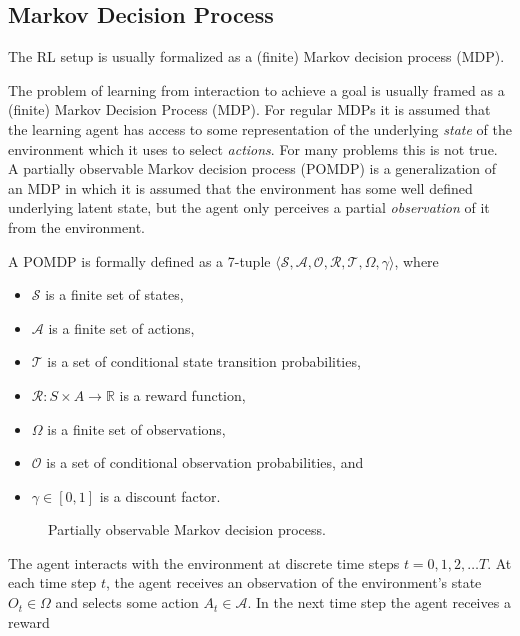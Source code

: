 \subsection{Markov Decision Process}

The RL setup is usually formalized as a (finite) Markov decision process (MDP).

The problem of learning from interaction to achieve a goal is usually framed as a (finite) Markov Decision Process (MDP). For regular MDPs it is assumed that the learning agent has access to some representation of the underlying \textit{state} of the environment which it uses to select \textit{actions}. For many problems this is not true. A partially observable Markov decision process (POMDP) is a generalization of an MDP in which it is assumed that the environment has some well defined underlying latent state, but the agent only perceives a partial \textit{observation} of it from the environment. 

A POMDP is formally defined as a 7-tuple \(\langle \mathcal{S}, \mathcal{A}, \mathcal{O}, \mathcal{R}, \mathcal{T}, \Omega, \gamma \rangle\), where

\begin{itemize}
    \item \(\mathcal{S}\) is a finite set of states,
    \item \(\mathcal{A}\) is a finite set of actions,
    \item \(\mathcal{T}\) is a set of conditional state transition probabilities,
    \item \(\mathcal{R} : S \times A \rightarrow \mathbb{R}\) is a reward function,
    \item \(\Omega\) is a finite set of observations,
    \item \(\mathcal{O}\) is a set of conditional observation probabilities, and
    \item \(\gamma \in [0, 1]\) is a discount factor.
\end{itemize}

\begin{figure}
    \centering
    
    \label{fig:pomdp}
    \caption{Partially observable Markov decision process.}
\end{figure}

The agent interacts with the environment at discrete time steps \(t = 0, 1, 2, \dots T\). At each time step \(t\), the agent receives an observation of the environment's state \(O_t \in \Omega\) and selects some action \(A_t \in \mathcal{A}\). In the next time step the agent receives a reward

